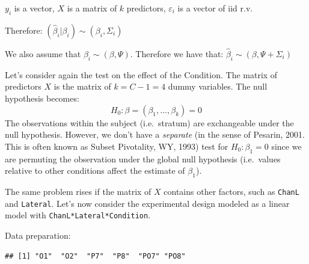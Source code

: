 \documentclass[
]{article}
\newenvironment{Shaded}{\begin{snugshade}}{\end{snugshade}}
\newcommand{\DecValTok}[1]{\textcolor[rgb]{0.00,0.00,0.81}{#1}}
\newcommand{\FunctionTok}[1]{\textcolor[rgb]{0.00,0.00,0.00}{#1}}
\newcommand{\NormalTok}[1]{#1}
\newcommand{\OtherTok}[1]{\textcolor[rgb]{0.56,0.35,0.01}{#1}}
\newcommand{\SpecialCharTok}[1]{\textcolor[rgb]{0.00,0.00,0.00}{#1}}
\newcommand{\StringTok}[1]{\textcolor[rgb]{0.31,0.60,0.02}{#1}}
\begin{document}
\(y_i\) is a vector, \(X\) is a matrix of \(k\) predictors,
\(\varepsilon_i\) is a vector of iid r.v.

Therefore: \((\hat\beta_i|\beta_i)\sim (\beta_i,\Sigma_i)\)

We also assume that \(\beta_i\sim(\beta,\Psi)\). Therefore we have that:
\(\hat\beta_i\sim (\beta,\Psi+\Sigma_i)\)

Let's consider again the test on the effect of the Condition. The matrix
of predictors \(X\) is the matrix of \(k=C-1=4\) dummy variables. The
null hypothesis becomes: \[H_0: \beta=(\beta_1,\ldots,\beta_k)=0\] The
observations within the subject (i.e.~stratum) are exchangeable under
the null hypothesis. However, we don't have a \emph{separate} (in the
sense of Pesarin, 2001. This is often known as Subset Pivotality, WY,
1993) test for \(H_0:\beta_1=0\) since we are permuting the observation
under the global null hypothesis (i.e.~values relative to other
conditions affect the estimate of \(\beta_1\)).

The same problem rises if the matrix of \(X\) contains other factors,
such as \texttt{ChanL} and \texttt{Lateral}. Let's now consider the
experimental design modeled as a linear model with
\texttt{ChanL*Lateral*Condition}.

Data preparation:

\begin{Shaded}
\end{Shaded}

\begin{verbatim}
## [1] "O1"  "O2"  "P7"  "P8"  "PO7" "PO8"
\end{verbatim}

\begin{Shaded}
\end{Shaded}
\end{document}
